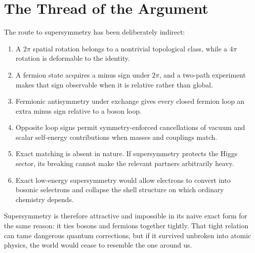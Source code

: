 \section{The Thread of the Argument}

The route to supersymmetry has been deliberately indirect:
\begin{enumerate}
\item A \(2\pi\) spatial rotation belongs to a nontrivial topological class, while a \(4\pi\) rotation is deformable to the identity.
\item A fermion state acquires a minus sign under \(2\pi\), and a two-path experiment makes that sign observable when it is relative rather than global.
\item Fermionic antisymmetry under exchange gives every closed fermion loop an extra minus sign relative to a boson loop.
\item Opposite loop signs permit symmetry-enforced cancellations of vacuum and scalar self-energy contributions when masses and couplings match.
\item Exact matching is absent in nature. If supersymmetry protects the Higgs sector, its breaking cannot make the relevant partners arbitrarily heavy.
\item Exact low-energy supersymmetry would allow electrons to convert into bosonic selectrons and collapse the shell structure on which ordinary chemistry depends.
\end{enumerate}

Supersymmetry is therefore attractive and impossible in its naive exact form for the same reason: it ties bosons and fermions together tightly. That tight relation can tame dangerous quantum corrections, but if it survived unbroken into atomic physics, the world would cease to resemble the one around us.
